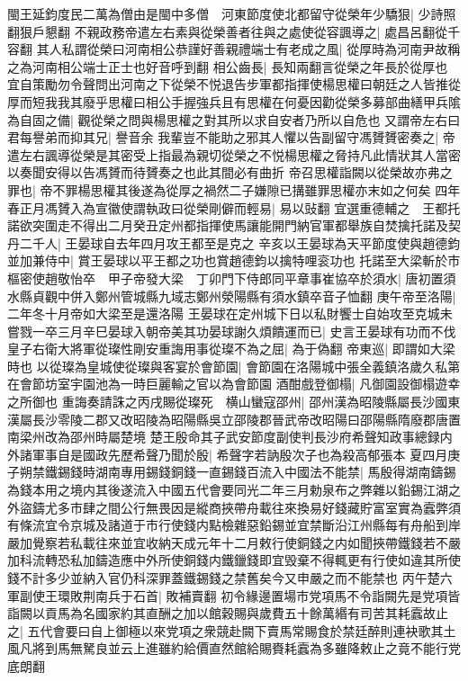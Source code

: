 閩王延鈞度民二萬為僧由是閩中多僧　河東節度使北都留守從榮年少驕狠|{
	少詩照翻狠戶懇翻}
不親政務帝遣左右素與從榮善者往與之處使從容諷導之|{
	處昌呂翻從千容翻}
其人私謂從榮曰河南相公恭謹好善親禮端士有老成之風|{
	從厚時為河南尹故稱之為河南相公端士正士也好音呼到翻}
相公齒長|{
	長知兩翻言從榮之年長於從厚也}
宜自策勵勿令聲問出河南之下從榮不悦退告步軍都指揮使楊思權曰朝廷之人皆推從厚而短我我其廢乎思權曰相公手握強兵且有思權在何憂因勸從榮多募部曲繕甲兵隂為自固之備|{
	觀從榮之問與楊思權之對其所以求自安者乃所以自危也}
又謂帝左右曰君每譽弟而抑其兄|{
	譽音余}
我輩豈不能助之邪其人懼以告副留守馮贇贇密奏之|{
	帝遣左右諷導從榮是其密受上指最為親切從榮之不悦楊思權之脅持凡此情狀其人當密以奏聞安得以告馮贇而待贇奏之也此其間必有曲折}
帝召思權詣闕以從榮故亦弗之罪也|{
	帝不罪楊思權其後遂為從厚之禍然二子嫌隙已搆雖罪思權亦末如之何矣}
四年春正月馮贇入為宣徽使謂執政曰從榮剛僻而輕易|{
	易以䜴翻}
宜選重德輔之　王都托諾欲突圍走不得出二月癸丑定州都指揮使馬讓能開門納官軍都舉族自焚擒托諾及契丹二千人|{
	王晏球自去年四月攻王都至是克之}
辛亥以王晏球為天平節度使與趙德鈞並加兼侍中|{
	賞王晏球以平王都之功也賞趙德鈞以擒特哩衮功也}
托諾至大梁斬於市　樞密使趙敬怡卒　甲子帝發大梁　丁卯門下侍郎同平章事崔協卒於須水|{
	唐初置須水縣貞觀中併入鄭州管城縣九域志鄭州滎陽縣有須水鎮卒音子恤翻}
庚午帝至洛陽|{
	二年冬十月帝如大梁至是還洛陽}
王晏球在定州城下日以私財饗士自始攻至克城未嘗戮一卒三月辛巳晏球入朝帝美其功晏球謝久煩饋運而已|{
	史言王晏球有功而不伐}
皇子右衛大將軍從璨性剛安重誨用事從璨不為之屈|{
	為于偽翻}
帝東巡|{
	即謂如大梁時也}
以從璨為皇城使從璨與客宴於會節園|{
	會節園在洛陽城中張全義鎮洛歲久私第在會節坊室宇園池為一時巨麗輸之官以為會節園}
酒酣戲登御榻|{
	凡御園設御榻遊幸之所御也}
重誨奏請誅之丙戌賜從璨死　横山蠻寇邵州|{
	邵州漢為昭陵縣屬長沙國東漢屬長沙零陵二郡又改昭陵為昭陽縣吳立邵陵郡晉武帝改昭陽曰邵陽縣隋廢郡唐置南梁州改為邵州時屬楚境}
楚王殷命其子武安節度副使判長沙府希聲知政事總録内外諸軍事自是國政先歷希聲乃聞於殷|{
	希聲字若訥殷次子也為殺高郁張本}
夏四月庚子朔禁鐵錫錢時湖南專用錫錢銅錢一直錫錢百流入中國法不能禁|{
	馬殷得湖南鑄錫為錢本用之境内其後遂流入中國五代會要同光二年三月勅泉布之弊雜以鉛錫江湖之外盜鑄尤多市肆之間公行無畏因是縱商挾帶舟載往來換易好錢藏貯富室實為蠧弊須有條流宜令京城及諸道于市行使錢内點檢雜惡鉛錫並宜禁斷沿江州縣每有舟船到岸嚴加覺察若私載往來並宜收納天成元年十二月敕行使銅錢之内如聞挾帶鐵錢若不嚴加科流轉恐私加鑄造應中外所使銅錢内鐵鑞錢即宜毁棄不得輒更有行使如違其所使錢不計多少並納入官仍科深罪蓋鐵錫錢之禁舊矣今又申嚴之而不能禁也}
丙午楚六軍副使王環敗荆南兵于石首|{
	敗補賣翻}
初令緣邊置場市党項馬不令詣闕先是党項皆詣闕以貢馬為名國家約其直酬之加以館穀賜與歲費五十餘萬緡有司苦其耗蠧故止之|{
	五代會要曰自上御極以來党項之衆競赴闕下賣馬常賜食於禁廷醉則連袂歌其土風凡將到馬無駑良並云上進雖約給價直然館給賜賚耗蠧為多雖降敕止之竟不能行党底朗翻}
